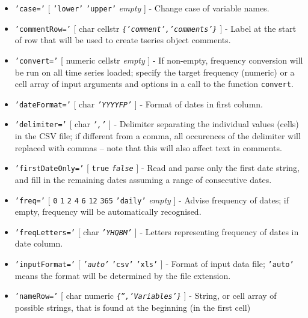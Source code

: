 \begin{itemize}
\item
  \texttt{'case='} {[} \texttt{'lower'} \textbar{} \texttt{'upper'}
  \textbar{} \emph{empty} {]} - Change case of variable names.
\item
  \texttt{'commentRow='} {[} char \textbar{} cellstr \textbar{}
  \emph{\texttt{\{'comment','comments'\}}} {]} - Label at the start of
  row that will be used to create tseries object comments.
\item
  \texttt{'convert='} {[} numeric \textbar{} cellstr \textbar{}
  \emph{empty} {]} - If non-empty, frequency conversion will be run on
  all time series loaded; specify the target frequency (numeric) or a
  cell array of input arguments and options in a call to the function
  \texttt{convert}.
\item
  \texttt{'dateFormat='} {[} char \textbar{} \emph{\texttt{'YYYYFP'}}
  {]} - Format of dates in first column.
\item
  \texttt{'delimiter='} {[} char \textbar{} \emph{\texttt{','}} {]} -
  Delimiter separating the individual values (cells) in the CSV file; if
  different from a comma, all occurences of the delimiter will replaced
  with commas -- note that this will also affect text in comments.
\item
  \texttt{'firstDateOnly='} {[} \texttt{true} \textbar{}
  \emph{\texttt{false}} {]} - Read and parse only the first date string,
  and fill in the remaining dates assuming a range of consecutive dates.
\item
  \texttt{'freq='} {[} \texttt{0} \textbar{} \texttt{1} \textbar{}
  \texttt{2} \textbar{} \texttt{4} \textbar{} \texttt{6} \textbar{}
  \texttt{12} \textbar{} \texttt{365} \textbar{} \texttt{'daily'}
  \textbar{} \emph{empty} {]} - Advise frequency of dates; if empty,
  frequency will be automatically recognised.
\item
  \texttt{'freqLetters='} {[} char \textbar{} \emph{\texttt{'YHQBM'}}
  {]} - Letters representing frequency of dates in date column.
\item
  \texttt{'inputFormat='} {[} \emph{\texttt{'auto'}} \textbar{}
  \texttt{'csv'} \textbar{} \texttt{'xls'} {]} - Format of input data
  file; \texttt{'auto'} means the format will be determined by the file
  extension.
\item
  \texttt{'nameRow='} {[} char \textbar{} numeric \textbar{}
  \emph{\texttt{\{'','Variables'\}}} {]} - String, or cell array of
  possible strings, that is found at the beginning (in the first cell)

\end{itemize}
